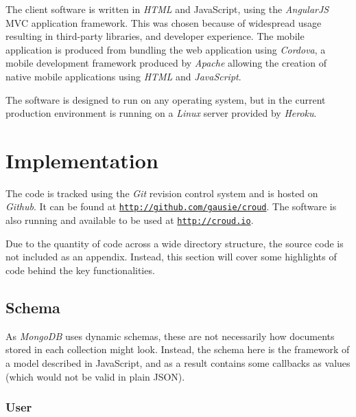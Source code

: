 \documentclass{article}
\let\oldsection\section
\renewcommand\section{\clearpage\oldsection}
\begin{document}
		The client software is written in \emph{HTML} and JavaScript, using the \emph{AngularJS} MVC application framework. This was chosen because of widespread usage resulting in third-party libraries, and developer experience. The mobile application is produced from bundling the web application using \emph{Cordova}, a mobile development framework produced by \emph{Apache} allowing the creation of native mobile applications using \emph{HTML} and \emph{JavaScript}.

		The software is designed to run on any operating system, but in the current production environment is running on a \emph{Linux} server provided by \emph{Heroku}.

	\section{Implementation}
	\label{sec:implementation}
		The code is tracked using the \emph{Git} revision control system and is hosted on \emph{Github}. It can be found at \href{http://github.com/gausie/croud}{\nolinkurl{http://github.com/gausie/croud}}. The software is also running and available to be used at \href{http://croud.io}{\nolinkurl{http://croud.io}}.

		Due to the quantity of code across a wide directory structure, the source code is not included as an appendix. Instead, this section will cover some highlights of code behind the key functionalities.

		\subsection{Schema}

		As \emph{MongoDB} uses dynamic schemas, these are not necessarily how documents stored in each collection might look. Instead, the schema here is the framework of a model described in JavaScript, and as a result contains some callbacks as values (which would not be valid in plain JSON).

		\subsubsection{User}
\end{document}
